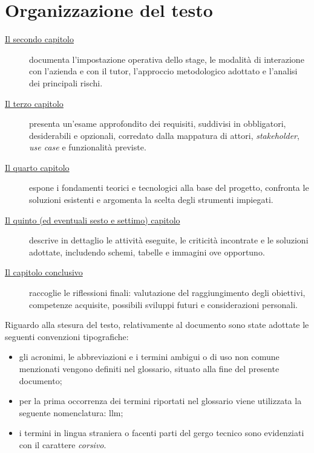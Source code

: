 \section{Organizzazione del testo}
\begin{description}
    \item[{\hyperref[chap:descrizione-stage]{Il secondo capitolo}}] documenta l’impostazione operativa dello stage, le modalità di interazione con l’azienda e con il tutor, l’approccio metodologico adottato e l’analisi dei principali rischi.

    \item[{\hyperref[chap:analisi-requisiti]{Il terzo capitolo}}] presenta un’esame approfondito dei requisiti, suddivisi in obbligatori, desiderabili e opzionali, corredato dalla mappatura di attori, \textit{stakeholder}, \textit{use case} e funzionalità previste.

    \item[{\hyperref[chap:introduzione-teorica]{Il quarto capitolo}}] espone i fondamenti teorici e tecnologici alla base del progetto, confronta le soluzioni esistenti e argomenta la scelta degli strumenti impiegati.

    \item[{\hyperref[chap:lavoro-svolto]{Il quinto (ed eventuali sesto e settimo) capitolo}}] descrive in dettaglio le attività eseguite, le criticità incontrate e le soluzioni adottate, includendo schemi, tabelle e immagini ove opportuno.

    \item[{\hyperref[chap:conclusioni]{Il capitolo conclusivo}}] raccoglie le riflessioni finali: valutazione del raggiungimento degli obiettivi, competenze acquisite, possibili sviluppi futuri e considerazioni personali.
\end{description}




Riguardo alla stesura del testo, relativamente al documento sono state adottate le seguenti convenzioni tipografiche:
\begin{itemize}
  \item gli acronimi, le abbreviazioni e i termini ambigui o di uso non comune menzionati vengono definiti nel glossario, situato alla fine del presente documento;
  \item per la prima occorrenza dei termini riportati nel glossario viene utilizzata la seguente nomenclatura: \gls{llm};
  \item i termini in lingua straniera o facenti parti del gergo tecnico sono evidenziati con il carattere \textit{corsivo}.
\end{itemize}

\newpage
